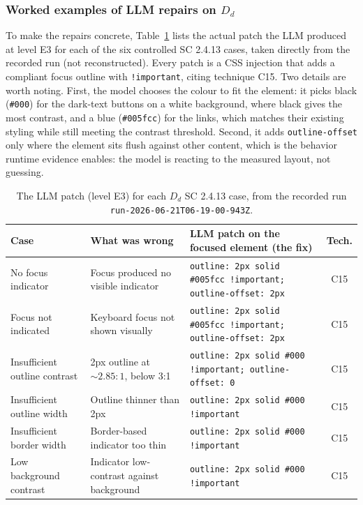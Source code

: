 \documentclass[11pt]{article}
\newcommand{\Dd}{\ensuremath{D_d}}
\begin{document}
\subsubsection{Worked examples of LLM repairs on \Dd}

To make the repairs concrete, Table~\ref{tab:examples} lists the actual patch the LLM
produced at level E3 for each of the six controlled SC 2.4.13 cases, taken directly
from the recorded run (not reconstructed). Every patch is a CSS injection that adds a
compliant focus outline with \texttt{!important}, citing technique C15. Two details
are worth noting. First, the model chooses the colour to fit the element: it picks
black (\texttt{\#000}) for the dark-text buttons on a white background, where black
gives the most contrast, and a blue (\texttt{\#005fcc}) for the links, which matches
their existing styling while still meeting the contrast threshold. Second, it adds
\texttt{outline-offset} only where the element sits flush against other content, which
is the behavior runtime evidence enables: the model is reacting to the measured
layout, not guessing.

\begin{table}[h]
\centering
\caption{The LLM patch (level E3) for each \Dd{} SC 2.4.13 case, from the recorded
run \texttt{run-2026-06-21T06-19-00-943Z}.}
\label{tab:examples}
\small
\begin{tabular}{p{2.4cm}p{3.3cm}p{6.0cm}c}
\toprule
Case & What was wrong & LLM patch on the focused element (the fix) & Tech. \\
\midrule
No focus indicator & Focus produced no visible indicator & \texttt{outline: 2px solid \#005fcc !important; outline-offset: 2px} & C15 \\
Focus not indicated & Keyboard focus not shown visually & \texttt{outline: 2px solid \#005fcc !important; outline-offset: 2px} & C15 \\
Insufficient outline contrast & 2px outline at ${\sim}2.85{:}1$, below 3:1 & \texttt{outline: 2px solid \#000 !important; outline-offset: 0} & C15 \\
Insufficient outline width & Outline thinner than 2px & \texttt{outline: 2px solid \#000 !important} & C15 \\
Insufficient border width & Border-based indicator too thin & \texttt{outline: 2px solid \#000 !important} & C15 \\
Low background contrast & Indicator low-contrast against background & \texttt{outline: 2px solid \#000 !important} & C15 \\
\bottomrule
\end{tabular}
\end{table}
\end{document}
